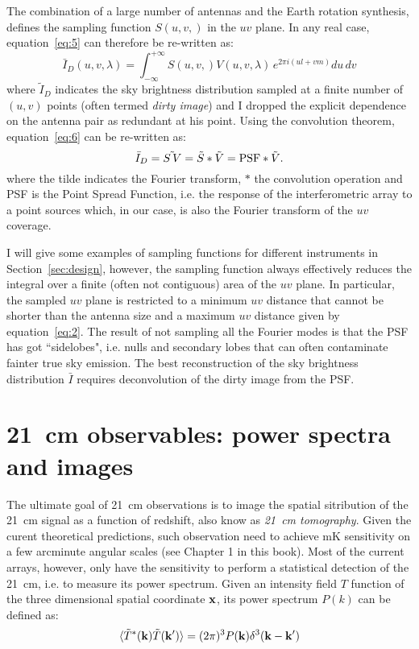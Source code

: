 The combination of a large number of antennas and the Earth rotation synthesis, defines the sampling function $S(u,v,)$ in the $uv$ plane. In any real case, equation~\ref{eq:5} can therefore be re-written as:
\begin{equation}
{\bar I}_D (u, v, \lambda) = \int_{- \infty}^{+ \infty} S(u,v,) V (u,v, \lambda) \, e^{2 \pi i (ul + vm)} du \, dv
\label{eq:6}
\end{equation}
where ${\tilde I}_D$ indicates the sky brightness distribution sampled at a finite number of $(u,v)$ points (often termed {\it dirty image}) and I dropped the explicit dependence on the antenna pair as redundant at his point. Using the convolution theorem, equation~\ref{eq:6} can be re-written as:
\begin{equation}
{\bar I}_D  =  \tilde{S \, V} =  {\tilde S} \ast {\tilde V} = {\rm PSF} \ast {\tilde V}.
\label{eq:6}
\end{equation}
where the tilde indicates the Fourier transform, $\ast$ the convolution operation and {\rm PSF} is the Point Spread Function, i.e. the response of the interferometric array to a point sources which, in our case, is also the Fourier transform of the $uv$ coverage.

I will give some examples of sampling functions for different instruments in Section~\ref{sec:design}, however, the sampling function always effectively reduces the integral over a finite (often not contiguous) area of the $uv$ plane. In particular, the sampled $uv$ plane is restricted to a minimum $uv$ distance that cannot be shorter than the antenna size and a maximum $uv$ distance given by equation~\ref{eq:2}. The result of not sampling all the Fourier modes is that the PSF has got ``sidelobes", i.e. nulls and secondary lobes that can often contaminate fainter true sky emission. The best reconstruction of the sky brightness distribution ${\bar I}$ requires deconvolution of the dirty image from the PSF. 




\section{21~cm observables: power spectra and images}
\label{sec:observables}

The ultimate goal of 21~cm observations is to image the spatial sitribution of the 21~cm signal as a function of redshift, also know as {\it 21~cm tomography}. Given the curent theoretical predictions, such observation need to achieve mK sensitivity on a few arcminute angular scales (see Chapter 1 in this book). Most of the current arrays, however, only have the sensitivity to perform a statistical detection of the 21~cm, i.e. to measure its power spectrum. Given an intensity field $T$ function of the three dimensional spatial coordinate $\bf x$, its power spectrum $P(k)$ can be defined as:
\begin{equation}
\langle {\tilde T}^* ({\bf k}) {\tilde T}({\bf k'}) \rangle = (2 \pi)^3 P({\bf k}) \delta^3({\bf k} - {\bf k}')
\end{equation}


